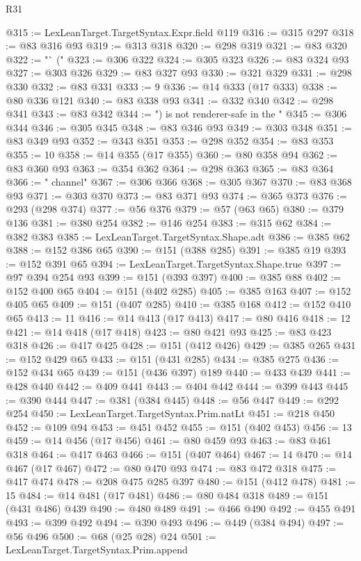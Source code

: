 \begin{lexlean}{R31}
\begin{coremodule}
@315 := LexLeanTarget.TargetSyntax.Expr.field @119
@316 := @315 @297
@318 := @83 @316 @93
@319 := @313 @318
@320 := @298 @319
@321 := @83 @320
@322 := "` ("
@323 := @306 @322
@324 := @305 @323
@326 := @83 @324 @93
@327 := @303 @326
@329 := @83 @327 @93
@330 := @321 @329
@331 := @298 @330
@332 := @83 @331
@333 := 9
@336 := @14 @333 (@17 @333)
@338 := @80 @336 @121
@340 := @83 @338 @93
@341 := @332 @340
@342 := @298 @341
@343 := @83 @342
@344 := ") is not renderer-safe in the "
@345 := @306 @344
@346 := @305 @345
@348 := @83 @346 @93
@349 := @303 @348
@351 := @83 @349 @93
@352 := @343 @351
@353 := @298 @352
@354 := @83 @353
@355 := 10
@358 := @14 @355 (@17 @355)
@360 := @80 @358 @94
@362 := @83 @360 @93
@363 := @354 @362
@364 := @298 @363
@365 := @83 @364
@366 := " channel"
@367 := @306 @366
@368 := @305 @367
@370 := @83 @368 @93
@371 := @303 @370
@373 := @83 @371 @93
@374 := @365 @373
@376 := @293 (@298 @374)
@377 := @56 @376
@379 := @57 (@63 @65)
@380 := @379 @136
@381 := @380 @254
@382 := @146 @254
@383 := @315 @62
@384 := @382 @383
@385 := LexLeanTarget.TargetSyntax.Shape.adt
@386 := @385 @62
@388 := @152 @386 @65
@390 := @151 (@388 @285)
@391 := @385 @19
@393 := @152 @391 @65
@394 := LexLeanTarget.TargetSyntax.Shape.true
@397 := @97 @394 @254 @93
@399 := @151 (@393 @397)
@400 := @385 @88
@402 := @152 @400 @65
@404 := @151 (@402 @285)
@405 := @385 @163
@407 := @152 @405 @65
@409 := @151 (@407 @285)
@410 := @385 @168
@412 := @152 @410 @65
@413 := 11
@416 := @14 @413 (@17 @413)
@417 := @80 @416
@418 := 12
@421 := @14 @418 (@17 @418)
@423 := @80 @421 @93
@425 := @83 @423 @318
@426 := @417 @425
@428 := @151 (@412 @426)
@429 := @385 @265
@431 := @152 @429 @65
@433 := @151 (@431 @285)
@434 := @385 @275
@436 := @152 @434 @65
@439 := @151 (@436 @397) @189
@440 := @433 @439
@441 := @428 @440
@442 := @409 @441
@443 := @404 @442
@444 := @399 @443
@445 := @390 @444
@447 := @381 (@384 @445)
@448 := @56 @447
@449 := @292 @254
@450 := LexLeanTarget.TargetSyntax.Prim.natLt
@451 := @218 @450
@452 := @109 @94
@453 := @451 @452
@455 := @151 (@402 @453)
@456 := 13
@459 := @14 @456 (@17 @456)
@461 := @80 @459 @93
@463 := @83 @461 @318
@464 := @417 @463
@466 := @151 (@407 @464)
@467 := 14
@470 := @14 @467 (@17 @467)
@472 := @80 @470 @93
@474 := @83 @472 @318
@475 := @417 @474
@478 := @208 @475 @285 @397
@480 := @151 (@412 @478)
@481 := 15
@484 := @14 @481 (@17 @481)
@486 := @80 @484 @318
@489 := @151 (@431 @486) @439
@490 := @480 @489
@491 := @466 @490
@492 := @455 @491
@493 := @399 @492
@494 := @390 @493
@496 := @449 (@384 @494)
@497 := @56 @496
@500 := @68 (@25 @28) @24
@501 := LexLeanTarget.TargetSyntax.Prim.append

\end{coremodule}
\end{lexlean}
